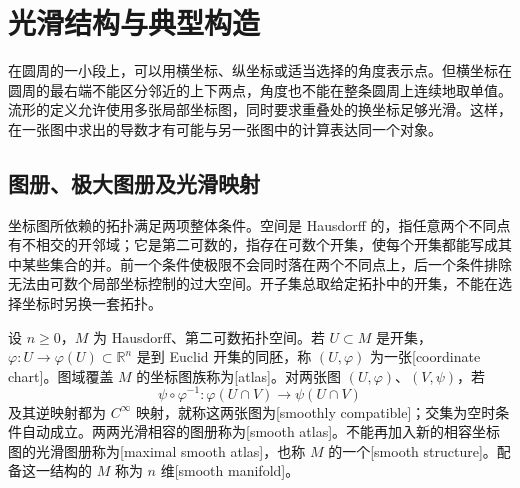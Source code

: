 
% 
% 

\section{光滑结构与典型构造}
\label{g1:sec:1101}

在圆周的一小段上，可以用横坐标、纵坐标或适当选择的角度表示点。但横坐标在圆周的最右端不能区分邻近的上下两点，角度也不能在整条圆周上连续地取单值。流形的定义允许使用多张局部坐标图，同时要求重叠处的换坐标足够光滑。这样，在一张图中求出的导数才有可能与另一张图中的计算表达同一个对象。

\subsection{图册、极大图册及光滑映射}
\label{g1:subsec:1101:01}

坐标图所依赖的拓扑满足两项整体条件。空间是 Hausdorff 的，指任意两个不同点有不相交的开邻域；它是第二可数的，指存在可数个开集，使每个开集都能写成其中某些集合的并。前一个条件使极限不会同时落在两个不同点上，后一个条件排除无法由可数个局部坐标控制的过大空间。开子集总取给定拓扑中的开集，不能在选择坐标时另换一套拓扑。

\begin{definition}
	\label{g1:def:smooth-manifold}
	设 \(n\geq0\)，\(M\) 为 Hausdorff、第二可数拓扑空间。若 \(U\subset M\) 是开集，\(\varphi:U\to\varphi(U)\subset\mathbb R^n\) 是到 Euclid 开集的同胚，称 \((U,\varphi)\) 为一张[coordinate chart]。图域覆盖 \(M\) 的坐标图族称为[atlas]。对两张图 \((U,\varphi)\)、\((V,\psi)\)，若
	\[
		\psi\circ\varphi^{-1}:\varphi(U\cap V)\longrightarrow\psi(U\cap V)
	\]
	及其逆映射都为 \(C^\infty\) 映射，就称这两张图为[smoothly compatible]；交集为空时条件自动成立。两两光滑相容的图册称为[smooth atlas]。不能再加入新的相容坐标图的光滑图册称为[maximal smooth atlas]，也称 \(M\) 的一个[smooth structure]。配备这一结构的 \(M\) 称为 \(n\) 维[smooth manifold]。
\end{definition}


